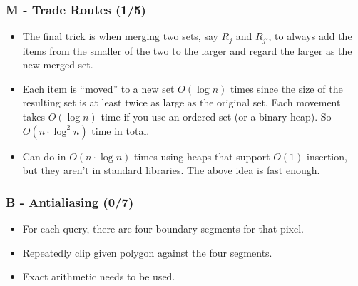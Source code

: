 \documentclass{beamer}
\begin{document}
\begin{frame}
\frametitle{M - Trade Routes (1/5)}
\begin{itemize}
\setlength\itemsep{0.5\baselineskip}
\item The final trick is when merging two sets, say $R_j$ and $R_{j'}$, to always add the items from the smaller of the two to the larger and regard the larger as the new merged set.
\item Each item is ``moved'' to a new set $O(\log n)$ times since the size of the resulting set is at least twice as large as the original set. Each movement takes $O(\log n)$ time if you use an ordered set (or a binary heap). So $O(n \cdot \log^2 n)$ time in total.
\item Can do in $O(n \cdot \log n)$ times using heaps that support $O(1)$ insertion, but they aren't in standard libraries. The above idea is fast enough.
\end{itemize}
\end{frame}




\begin{frame}
\frametitle{B - Antialiasing (0/7)}
\begin{itemize}
\setlength\itemsep{0.5\baselineskip}
\item For each query, there are four boundary segments for that pixel.
\item Repeatedly clip given polygon against the four segments.
\item Exact arithmetic needs to be used.
\end{itemize}
\end{frame}
\end{document}
